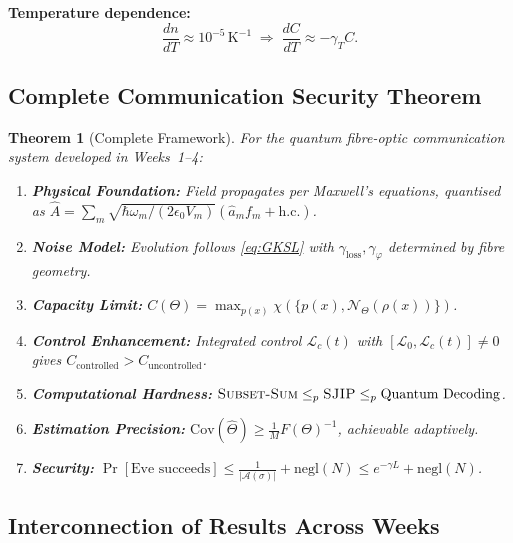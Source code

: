 \documentclass[12pt,a4paper]{article}
\theoremstyle{definition}
\theoremstyle{plain}
\newtheorem{theorem}{Theorem}[section]
\begin{document}
\textbf{Temperature dependence:}
\begin{equation}
\frac{dn}{dT}\approx10^{-5}\,\mathrm{K}^{-1}\;\Longrightarrow\;\frac{dC}{dT}\approx-\gamma_T C.
\end{equation}

\subsection{Complete Communication Security Theorem}

\begin{tcolorbox}[highlight, title={Complete Framework Theorem}]
\begin{theorem}[Complete Framework]
For the quantum fibre-optic communication system developed in Weeks~1--4:
\begin{enumerate}[label=(\arabic*), leftmargin=*]
  \item \textbf{Physical Foundation:} Field propagates per Maxwell's equations, quantised
    as $\hat{A}=\sum_m\sqrt{\hbar\omega_m/(2\epsilon_0 V_m)}(\hat{a}_m f_m+\mathrm{h.c.})$.
  \item \textbf{Noise Model:} Evolution follows \cref{eq:GKSL} with $\gamma_{\mathrm{loss}},\gamma_\varphi$
    determined by fibre geometry.
  \item \textbf{Capacity Limit:} $C(\Theta)=\max_{p(x)}\chi(\{p(x),\mathcal{N}_\Theta(\rho(x))\})$.
  \item \textbf{Control Enhancement:} Integrated control $\mathcal{L}_c(t)$ with
    $[\mathcal{L}_0,\mathcal{L}_c(t)]\ne0$ gives $C_{\mathrm{controlled}}>C_{\mathrm{uncontrolled}}$.
  \item \textbf{Computational Hardness:}
    $\textsc{Subset-Sum}\le_p\textsc{SJIP}\le_p\text{Quantum Decoding}$.
  \item \textbf{Estimation Precision:} $\mathrm{Cov}(\hat\Theta)\ge\frac{1}{M}F(\Theta)^{-1}$,
    achievable adaptively.
  \item \textbf{Security:}
    $\Pr[\text{Eve succeeds}]\le\frac{1}{|\mathcal{A}(\sigma)|}+\mathrm{negl}(N)\le e^{-\gamma L}+\mathrm{negl}(N)$.
\end{enumerate}
\end{theorem}
\end{tcolorbox}

\subsection{Interconnection of Results Across Weeks}
\end{document}
